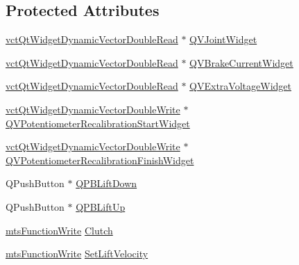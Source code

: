 \subsection*{Protected Attributes}
\begin{DoxyCompactItemize}
\item 
\hyperlink{vct_qt_forward_declarations_8h_a6cbce1b6d338096215fc40cb0fdfb848}{vct\-Qt\-Widget\-Dynamic\-Vector\-Double\-Read} $\ast$ \hyperlink{classmts_intuitive_research_kit_s_u_j_qt_widget_a417d19b93d1c5fd6107b50d18b63bb57}{Q\-V\-Joint\-Widget}
\item 
\hyperlink{vct_qt_forward_declarations_8h_a6cbce1b6d338096215fc40cb0fdfb848}{vct\-Qt\-Widget\-Dynamic\-Vector\-Double\-Read} $\ast$ \hyperlink{classmts_intuitive_research_kit_s_u_j_qt_widget_ac3af0b96a3a655d64d65f5d0e1dd059f}{Q\-V\-Brake\-Current\-Widget}
\item 
\hyperlink{vct_qt_forward_declarations_8h_a6cbce1b6d338096215fc40cb0fdfb848}{vct\-Qt\-Widget\-Dynamic\-Vector\-Double\-Read} $\ast$ \hyperlink{classmts_intuitive_research_kit_s_u_j_qt_widget_ade908017769bb3fa631ce844e00bd135}{Q\-V\-Extra\-Voltage\-Widget}
\item 
\hyperlink{vct_qt_forward_declarations_8h_a00a3bf90f51dee6e85465b73dacde15b}{vct\-Qt\-Widget\-Dynamic\-Vector\-Double\-Write} $\ast$ \hyperlink{classmts_intuitive_research_kit_s_u_j_qt_widget_a90487038636f831253a41d59391429ed}{Q\-V\-Potentiometer\-Recalibration\-Start\-Widget}
\item 
\hyperlink{vct_qt_forward_declarations_8h_a00a3bf90f51dee6e85465b73dacde15b}{vct\-Qt\-Widget\-Dynamic\-Vector\-Double\-Write} $\ast$ \hyperlink{classmts_intuitive_research_kit_s_u_j_qt_widget_a8eae46129008a47515963214cf9f1889}{Q\-V\-Potentiometer\-Recalibration\-Finish\-Widget}
\item 
Q\-Push\-Button $\ast$ \hyperlink{classmts_intuitive_research_kit_s_u_j_qt_widget_ac854697fe83aaf40e0b1f9b452707693}{Q\-P\-B\-Lift\-Down}
\item 
Q\-Push\-Button $\ast$ \hyperlink{classmts_intuitive_research_kit_s_u_j_qt_widget_a9d9a974b34bbba15e099f2da0714e900}{Q\-P\-B\-Lift\-Up}
\item 
\hyperlink{classmts_function_write}{mts\-Function\-Write} \hyperlink{classmts_intuitive_research_kit_s_u_j_qt_widget_a68bdbf6fee7bedf5f237795330af4457}{Clutch}
\item 
\hyperlink{classmts_function_write}{mts\-Function\-Write} \hyperlink{classmts_intuitive_research_kit_s_u_j_qt_widget_a45483aaeb40122c980fc3d26fbcfaaec}{Set\-Lift\-Velocity}

\end{DoxyCompactItemize}
